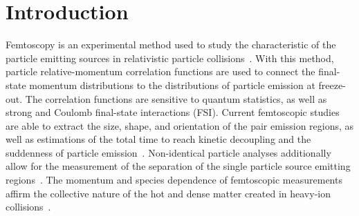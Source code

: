\documentclass[ALICE,manyauthors]{cernphprep}
\begin{document}
\setcounter{page}{2}

\section{Introduction}
\label{sec:Introduction}

Femtoscopy is an experimental method used to study the {\color{red}{space-time}} {\color{blue}{space--time}} characteristic of the particle emitting sources in relativistic particle collisions~\cite{Lisa:2005dd}.  
With this method, {\color{red}{two (or many)-}} {\color{blue}{two- (or many-)}} particle relative-momentum correlation functions are used to connect the final-state momentum distributions to the {\color{red}{space-time}} {\color{blue}{space--time}} distributions of particle emission at freeze-out.  
The correlation functions are sensitive to quantum statistics, as well as strong and Coulomb final-state interactions (FSI).  
Current femtoscopic studies are able to extract the size, shape, and orientation of the pair emission regions, as well as {\color{red}{offering}} {\color{blue}{offer}} estimations of the total time to reach kinetic decoupling and the suddenness of particle emission~{}.
Non-identical particle analyses additionally allow for the measurement of the {\color{red}{space-time}} {\color{blue}{space--time}} separation of the single particle source emitting regions~{}.
The momentum and species dependence of femtoscopic measurements affirm the collective nature of the hot and dense matter created in heavy-ion collisions~{}.
\end{document}
